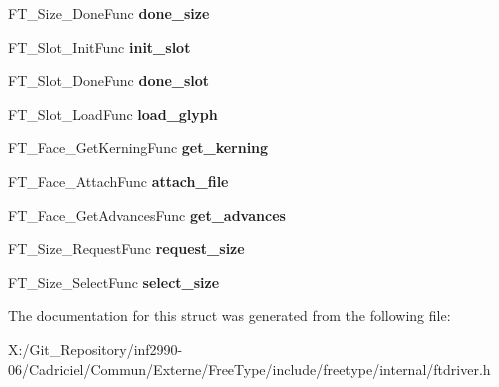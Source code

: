 \begin{DoxyCompactItemize}
\item 
\hypertarget{struct_f_t___driver___class_rec___a5c96f627816a089b27bcff09f22dd1a6}{F\-T\-\_\-\-Size\-\_\-\-Done\-Func {\bfseries done\-\_\-size}}\label{struct_f_t___driver___class_rec___a5c96f627816a089b27bcff09f22dd1a6}

\item 
\hypertarget{struct_f_t___driver___class_rec___ae4e1d4ec7bdbdee0b4a5f8fc8f113d30}{F\-T\-\_\-\-Slot\-\_\-\-Init\-Func {\bfseries init\-\_\-slot}}\label{struct_f_t___driver___class_rec___ae4e1d4ec7bdbdee0b4a5f8fc8f113d30}

\item 
\hypertarget{struct_f_t___driver___class_rec___a548a343f5921f5d341142bf3743c42d4}{F\-T\-\_\-\-Slot\-\_\-\-Done\-Func {\bfseries done\-\_\-slot}}\label{struct_f_t___driver___class_rec___a548a343f5921f5d341142bf3743c42d4}

\item 
\hypertarget{struct_f_t___driver___class_rec___a49dbd71e64094d4d825b8b8d51dd4e47}{F\-T\-\_\-\-Slot\-\_\-\-Load\-Func {\bfseries load\-\_\-glyph}}\label{struct_f_t___driver___class_rec___a49dbd71e64094d4d825b8b8d51dd4e47}

\item 
\hypertarget{struct_f_t___driver___class_rec___a398395bfdbef65a8d531724d200ed91c}{F\-T\-\_\-\-Face\-\_\-\-Get\-Kerning\-Func {\bfseries get\-\_\-kerning}}\label{struct_f_t___driver___class_rec___a398395bfdbef65a8d531724d200ed91c}

\item 
\hypertarget{struct_f_t___driver___class_rec___a9caec9ae56a4bab9c90cede699279f29}{F\-T\-\_\-\-Face\-\_\-\-Attach\-Func {\bfseries attach\-\_\-file}}\label{struct_f_t___driver___class_rec___a9caec9ae56a4bab9c90cede699279f29}

\item 
\hypertarget{struct_f_t___driver___class_rec___aad560cd145b6d7cab7eae79194b1d724}{F\-T\-\_\-\-Face\-\_\-\-Get\-Advances\-Func {\bfseries get\-\_\-advances}}\label{struct_f_t___driver___class_rec___aad560cd145b6d7cab7eae79194b1d724}

\item 
\hypertarget{struct_f_t___driver___class_rec___a03ff7c2e4a2fb6d08eb481b03a78e8de}{F\-T\-\_\-\-Size\-\_\-\-Request\-Func {\bfseries request\-\_\-size}}\label{struct_f_t___driver___class_rec___a03ff7c2e4a2fb6d08eb481b03a78e8de}

\item 
\hypertarget{struct_f_t___driver___class_rec___a1b365eb82525dae0a816974d949fe0dd}{F\-T\-\_\-\-Size\-\_\-\-Select\-Func {\bfseries select\-\_\-size}}\label{struct_f_t___driver___class_rec___a1b365eb82525dae0a816974d949fe0dd}

\end{DoxyCompactItemize}


The documentation for this struct was generated from the following file\-:\begin{DoxyCompactItemize}
\item 
X\-:/\-Git\-\_\-\-Repository/inf2990-\/06/\-Cadriciel/\-Commun/\-Externe/\-Free\-Type/include/freetype/internal/ftdriver.\-h\end{DoxyCompactItemize}
